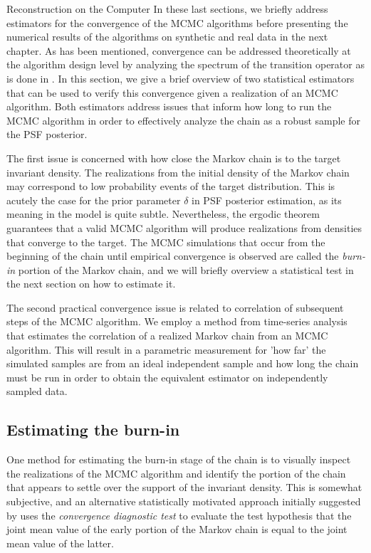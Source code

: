 \begin{chapter}{Reconstruction on the Computer}
In these last sections, we briefly address estimators for the convergence of the MCMC algorithms before presenting the numerical results of the algorithms on synthetic and real data in the next chapter.
As has been mentioned, convergence can be addressed theoretically at the algorithm design level by analyzing the spectrum of the transition operator as is done in \citep{agapiou2014analysis,van2008partially}.
In this section, we give a brief overview of two statistical estimators that can be used to verify this convergence given a realization of an MCMC algorithm.
Both estimators address issues that inform how long to run the MCMC algorithm in order to effectively analyze the chain as a robust sample for the PSF posterior. 

The first issue is concerned with how close the Markov chain is to the target invariant density.
The realizations from the initial density of the Markov chain may correspond to low probability events of the target distribution.
This is acutely the case for the prior parameter $\delta$ in PSF posterior estimation, as its meaning in the model is quite subtle.
Nevertheless, the ergodic theorem guarantees that a valid MCMC algorithm will produce realizations from densities that converge to the target.
The MCMC simulations that occur from the beginning of the chain until empirical convergence is observed are called the \emph{burn-in} portion of the Markov chain, and we will briefly overview a statistical test in the next section on how to estimate it.

The second practical convergence issue is related to correlation of subsequent steps of the MCMC algorithm.
We employ a method from time-series analysis that estimates the correlation of a realized Markov chain from an MCMC algorithm.
This will result in a parametric measurement for 'how far' the simulated samples are from an ideal independent sample and how long the chain must be run in order to obtain the equivalent estimator on independently sampled data.

\subsection{Estimating the burn-in}

One method for estimating the burn-in stage of the chain is to visually inspect the realizations of the MCMC algorithm and identify the portion of the chain that appears to settle over the support of the invariant density.
This is somewhat subjective, and an alternative statistically motivated approach initially suggested by \citep{geweke1991evaluating} uses the \emph{convergence diagnostic test} to evaluate the test hypothesis that the joint mean value of the early portion of the Markov chain is equal to the joint mean value of the latter. 


\end{chapter}
